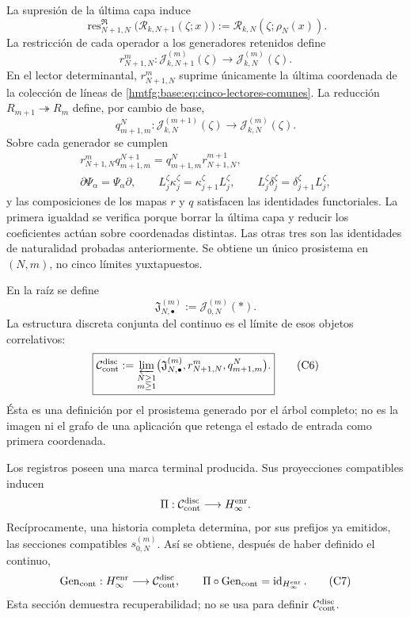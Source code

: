 La supresión de la última capa induce
\[
 \operatorname{res}^{\mathfrak R}_{N+1,N}
 \bigl(\mathscr R_{k,N+1}(\zeta;x)\bigr)
 :=\mathscr R_{k,N}(\zeta;\rho_N(x)).
\]
La restricción de cada operador a los generadores retenidos define
\[
 r^m_{N+1,N}:\mathcal J_{k,N+1}^{(m)}(\zeta)
 \longrightarrow\mathcal J_{k,N}^{(m)}(\zeta).
\]
En el lector determinantal, \(r^m_{N+1,N}\) suprime únicamente la última
coordenada de la colección de líneas de
\eqref{hmtfg:base:eq:cinco-lectores-comunes}. La reducción
\(R_{m+1}\twoheadrightarrow R_m\) define, por cambio de base,
\[
 q^N_{m+1,m}:\mathcal J_{k,N}^{(m+1)}(\zeta)
 \longrightarrow\mathcal J_{k,N}^{(m)}(\zeta).
\]
Sobre cada generador se cumplen
\[
\begin{gathered}
 r^m_{N+1,N}q^{N+1}_{m+1,m}
 =q^N_{m+1,m}r^{m+1}_{N+1,N},\\
 \partial\Psi_\alpha=\Psi_\alpha\partial,
 \qquad L_j^\zeta\kappa_j^\zeta
       =\kappa_{j+1}^\zeta L_j^\zeta,
 \qquad L_j^\zeta\delta_j^\zeta
       =\delta_{j+1}^\zeta L_j^\zeta,
\end{gathered}
\tag{C4}
\label{hmtfg:base:eq:naturalidad-D}
\]
y las composiciones de los mapas \(r\) y \(q\) satisfacen las identidades
functoriales. La primera igualdad se verifica porque borrar la última capa y
reducir los coeficientes actúan sobre coordenadas distintas. Las otras tres
son las identidades de naturalidad probadas anteriormente. Se obtiene un único
prosistema en \((N,m)\), no cinco límites yuxtapuestos.

En la raíz se define
\[
 \mathfrak J_{N,\bullet}^{(m)}:=\mathcal J_{0,N}^{(m)}(\ast).
\tag{C5}
\label{hmtfg:base:eq:fibras-conjuntas-horizonte}
\]
La estructura discreta conjunta del continuo es el límite de esos objetos
correlativos:
\[
 \boxed{
 \mathcal C_{\rm cont}^{\rm disc}
 :=\varprojlim_{\substack{N\geq1\\m\geq1}}
   \bigl(\mathfrak J_{N,\bullet}^{(m)},
         r^m_{N+1,N},q^N_{m+1,m}\bigr).}
\tag{C6}
\label{hmtfg:base:eq:continuo-discreto}
\]
Ésta es una definición por el prosistema generado por el árbol completo; no es
la imagen ni el grafo de una aplicación que retenga el estado de entrada como
primera coordenada.

Los registros poseen una marca terminal producida. Sus proyecciones compatibles
inducen
\[
 \Pi:\mathcal C_{\rm cont}^{\rm disc}\longrightarrow H_\infty^{\rm enr}.
\]
Recíprocamente, una historia completa determina, por sus prefijos ya emitidos,
las secciones compatibles \(s_{0,N}^{(m)}\). Así se obtiene, después de haber
definido el continuo,
\[
 \operatorname{Gen}_{\rm cont}:H_\infty^{\rm enr}
 \longrightarrow\mathcal C_{\rm cont}^{\rm disc},
 \qquad
 \Pi\circ\operatorname{Gen}_{\rm cont}
 =\operatorname{id}_{H_\infty^{\rm enr}}.
\tag{C7}
\label{hmtfg:base:eq:seccion-historias-continuo}
\]
Esta sección demuestra recuperabilidad; no se usa para definir
\(\mathcal C_{\rm cont}^{\rm disc}\).

